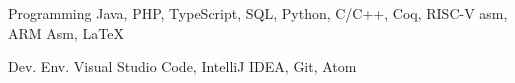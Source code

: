 

\begin{cvskills}

	\cvskill
	{Programming} %
	{Java, PHP, TypeScript, SQL, Python, C/C++, Coq, RISC-V asm, ARM Asm, \LaTeX} %

	\cvskill
	{Dev. Env.} %
	{Visual Studio Code, IntelliJ IDEA, Git, Atom} %

\end{cvskills}
